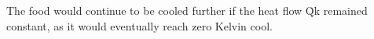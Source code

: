 The food would continue to be cooled further if the heat flow Q̇k remained constant, as it would eventually reach zero Kelvin cool.